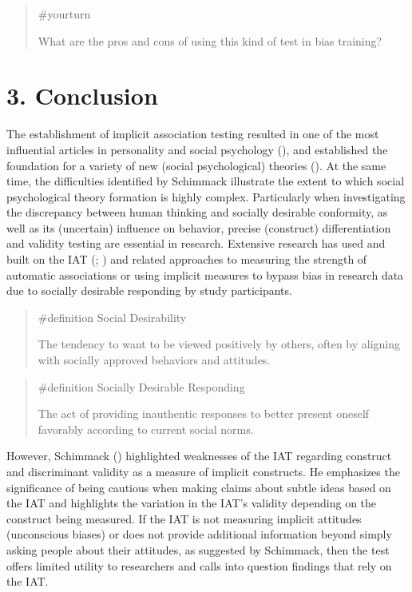 \documentclass[
  letterpaper,
]{book}
\begin{document}
\begin{quote}
{\#yourturn}

What are the pros and cons of using this kind of test in bias training?
\end{quote}

\section{3. Conclusion}\label{conclusion-2}

The establishment of implicit association testing resulted in one of the
most influential articles in personality and social psychology
(), and
established the foundation for a variety of new (social psychological)
theories (). At the same
time, the difficulties identified by Schimmack illustrate the extent to
which social psychological theory formation is highly complex.
Particularly when investigating the discrepancy between human thinking
and socially desirable conformity, as well as its (uncertain) influence
on behavior, precise (construct) differentiation and validity testing
are essential in research. Extensive research has used and built on the
IAT (;
) and related
approaches to measuring the strength of automatic associations or using
implicit measures to bypass bias in research data due to socially
desirable responding by study participants.

\begin{quote}
\label{def-socialdesirability}{\#definition} Social
Desirability

The tendency to want to be viewed positively by others, often by
aligning with socially approved behaviors and attitudes.
\end{quote}

\begin{quote}
\label{def-sociallydesirableresponding}{\#definition}
Socially Desirable Responding

The act of providing inauthentic responses to better present oneself
favorably according to current social norms.
\end{quote}

However, Schimmack () highlighted
weaknesses of the IAT regarding construct and discriminant validity as a
measure of implicit constructs. He emphasizes the significance of being
cautious when making claims about subtle ideas based on the IAT and
highlights the variation in the IAT's validity depending on the
construct being measured. If the IAT is not measuring implicit attitudes
(unconscious biases) or does not provide additional information beyond
simply asking people about their attitudes, as suggested by Schimmack,
then the test offers limited utility to researchers and calls into
question findings that rely on the IAT.
\end{document}
